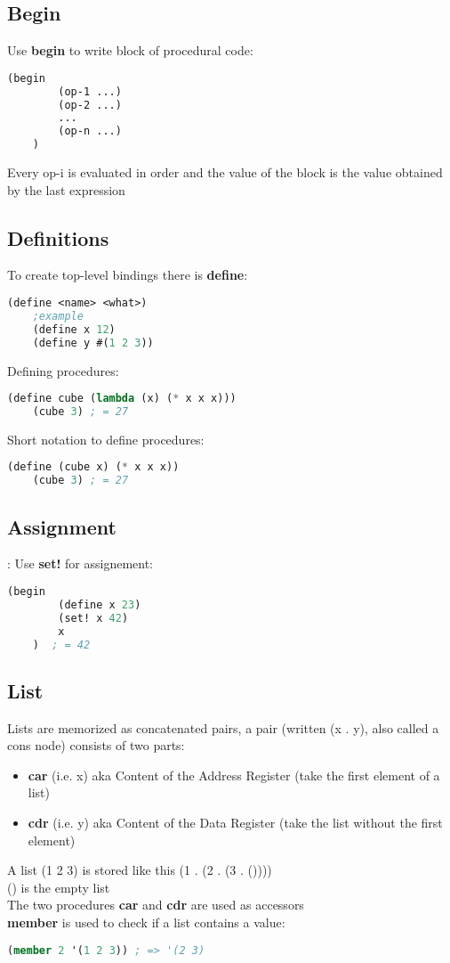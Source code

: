 \subsection{Begin}
Use \textbf{begin} to write block of procedural code:
\begin{lstlisting}[language=Lisp]
    (begin
        (op-1 ...)
        (op-2 ...)
        ...
        (op-n ...)
    )
\end{lstlisting}

Every op-i is evaluated in order and the value of the block is the value obtained by the last expression

\subsection{Definitions}
To create top-level bindings there is \textbf{define}:
\begin{lstlisting}[language=Lisp]
    (define <name> <what>)
    ;example
    (define x 12)
    (define y #(1 2 3))
\end{lstlisting}
Defining procedures:
\begin{lstlisting}[language=Lisp]
    (define cube (lambda (x) (* x x x)))
    (cube 3) ; = 27
\end{lstlisting}
Short notation to define procedures:
\begin{lstlisting}[language=Lisp]
    (define (cube x) (* x x x))
    (cube 3) ; = 27
\end{lstlisting}

\subsection{Assignment}:
Use \textbf{set!} for assignement:
\begin{lstlisting}[language=Lisp]
    (begin
        (define x 23)
        (set! x 42)
        x
    )  ; = 42
\end{lstlisting}

\subsection{List}
Lists are memorized as concatenated pairs, a pair (written (x . y), also called a cons node) consists of two parts:
\begin{itemize}
    \item \textbf{car} (i.e. x) aka Content of the Address Register (take the first element of a list)
    \item \textbf{cdr} (i.e. y) aka Content of the Data Register (take the list without the first element)
\end{itemize}
A list (1 2 3) is stored like this (1 . (2 . (3 . ()))) \\
() is the empty list \\
The two procedures \textbf{car} and \textbf{cdr} are used as accessors \\
\textbf{member} is used to check if a list contains a value:
\begin{lstlisting}[language=Lisp]
    (member 2 '(1 2 3)) ; => '(2 3)
\end{lstlisting}

